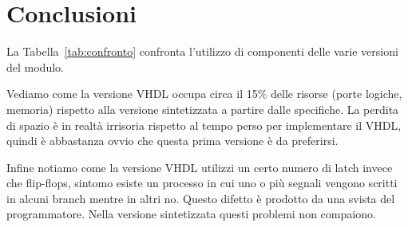 \section{Conclusioni}

La Tabella~\ref{tab:confronto} confronta l'utilizzo di componenti delle varie versioni del modulo.

Vediamo come la versione VHDL occupa circa il 15\% delle risorse (porte logiche, memoria) rispetto alla versione sintetizzata a partire dalle specifiche. La perdita di spazio è in realtà irrisoria rispetto al tempo perso per implementare il VHDL, quindi è abbastanza ovvio che questa prima versione è da preferirsi. 

Infine notiamo come la versione VHDL utilizzi un certo numero di latch invece che flip-flops, sintomo esiste un processo in cui uno o più segnali vengono scritti in alcuni branch mentre in altri no. Questo difetto è prodotto da una svista del programmatore. Nella versione sintetizzata questi problemi non compaiono.